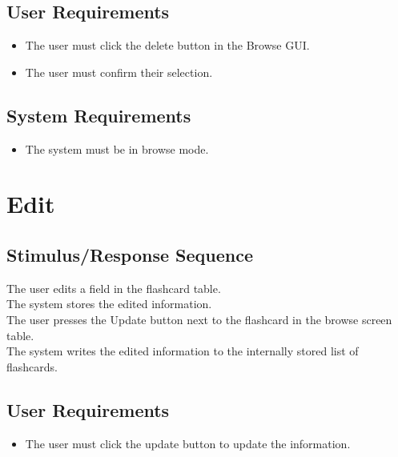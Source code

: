 \documentclass{scrreprt}
\newcommand{\smallspace}{\vspace{0.5cm}}
\begin{document}
    \subsection{User Requirements}
        \begin{itemize}
            \item The user must click the delete button in the Browse GUI.
            \item The user must confirm their selection.
        \end{itemize}

    \subsection{System Requirements}
        \begin{itemize}
            \item The system must be in browse mode.
        \end{itemize}

\section{Edit}
    \subsection{Stimulus/Response Sequence}
        \begin{flushleft}
             The user edits a field in the flashcard table. \\
             The system stores the edited information. \\
            \smallspace
             The user presses the Update button next to the flashcard in the browse screen table. \\
             The system writes the edited information to the internally stored list of flashcards. \\
        \end{flushleft}
    \subsection{User Requirements}
        \begin{itemize}
            \item The user must click the update button to update the information.
        \end{itemize}
\end{document}

